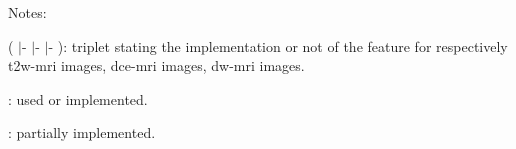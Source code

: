 \begin{table*}
\begin{threeparttable}
\begin{tabular}{p{.5\linewidth} p{.4\linewidth}}
      \hline
    \end{tabular}
    \begin{tablenotes}
      \footnotesize
    \item Notes:
    \item ( {\cmarksmall}$|$- {\cmarksmall}$|$- {\cmarksmall}$|$- ): triplet stating the implementation or not of the feature for respectively \ac{t2w}-\ac{mri} images, \ac{dce}-\ac{mri} images, \ac{dw}-\ac{mri} images.
    \item {\cmarksmall}: used or implemented.
    \item {\mmarksmall}: partially implemented.
    \end{tablenotes}
  \end{threeparttable}
\end{table*}
\restoregeometry


